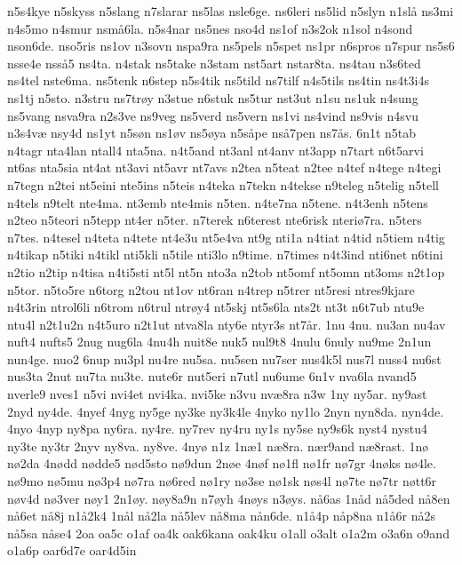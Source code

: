 {n5s4kye
n5skyss
n5slang
n7slarar
ns5las
nsle6ge.
ns6leri
ns5lid
n5slyn
n1sl^^e5
ns3mi
n4s5mo
n4smur
nsm^^e56la.
n5s4nar
ns5nes
nso4d
ns1of
n3s2ok
n1sol
n4sond
nson6de.
nso5ris
ns1ov
n3sovn
nspa9ra
ns5pels
n5spet
ns1pr
n6spros
n7spur
ns5s6
nsse4e
nss^^e55
ns4ta.
n4stak
ns5take
n3stam
nst5art
nstar8ta.
ns4tau
n3s6ted
ns4tel
nste6ma.
ns5tenk
n6step
n5s4tik
ns5tild
ns7tilf
n4s5tils
ns4tin
ns4t3i4s
ns1tj
n5sto.
n3stru
ns7tr^^f8y
n3stue
n6stuk
ns5tur
nst3ut
n1su
ns1uk
n4sung
ns5vang
nsva9ra
n2s3ve
ns9veg
ns5verd
ns5vern
ns1vi
ns4vind
ns9vis
n4svu
n3s4v^^e6
nsy4d
ns1yt
n5s^^f8n
ns1^^f8v
ns5^^f8ya
n5s^^e5pe
ns^^e57pen
ns7^^e5s.
6n1t
n5tab
n4tagr
nta4lan
ntall4
nta5na.
n4t5and
nt3anl
nt4anv
nt3app
n7tart
n6t5arvi
nt6as
nta5sia
nt4at
nt3avi
nt5avr
nt7avs
n2tea
n5teat
n2tee
n4tef
n4tege
n4tegi
n7tegn
n2tei
nt5eini
nte5ins
n5teis
n4teka
n7tekn
n4tekse
n9teleg
n5telig
n5tell
n4tels
n9telt
nte4ma.
nt3emb
nte4mis
n5ten.
n4te7na
n5tene.
n4t3enh
n5tens
n2teo
n5teori
n5tepp
nt4er
n5ter.
n7terek
n6terest
nte6risk
nteri^^f87ra.
n5ters
n7tes.
n4tesel
n4teta
n4tete
nt4e3u
nt5e4va
nt9g
nti1a
n4tiat
n4tid
n5tiem
n4tig
n4tikap
n5tiki
n4tikl
nti5kli
n5tile
nti3lo
n9time.
n7times
n4t3ind
nti6net
n6tini
n2tio
n2tip
n4tisa
n4ti5sti
nt5l
nt5n
nto3a
n2tob
nt5omf
nt5omn
nt3oms
n2t1op
n5tor.
n5to5re
n6torg
n2tou
nt1ov
nt6ran
n4trep
n5trer
nt5resi
ntres9kjare
n4t3rin
ntrol6li
n6trom
n6trul
ntr^^f8y4
nt5skj
nt5s6la
nts2t
nt3t
n6t7ub
ntu9e
ntu4l
n2t1u2n
n4t5uro
n2t1ut
ntva8la
nty6e
ntyr3s
nt7^^e5r.
1nu
4nu.
nu3an
nu4av
nuft4
nufts5
2nug
nug6la
4nu4h
nuit8e
nuk5
nul9t8
4nulu
6nuly
nu9me
2n1un
nun4ge.
nuo2
6nup
nu3pl
nu4re
nu5sa.
nu5sen
nu7ser
nus4k5l
nus7l
nuss4
nu6st
nus3ta
2nut
nu7ta
nu3te.
nute6r
nut5eri
n7utl
nu6ume
6n1v
nva6la
nvand5
nverle9
nves1
n5vi
nvi4et
nvi4ka.
nvi5ke
n3vu
nv^^e68ra
n3w
1ny
ny5ar.
ny9ast
2nyd
ny4de.
4nyef
4nyg
ny5ge
ny3ke
ny3k4le
4nyko
ny1lo
2nyn
nyn8da.
nyn4de.
4nyo
4nyp
ny8pa
ny6ra.
ny4re.
ny7rev
ny4ru
ny1s
ny5se
ny9s6k
nyst4
nystu4
ny3te
ny3tr
2nyv
ny8va.
ny8ve.
4ny^^f8
n1z
1n^^e61
n^^e68ra.
n^^e6r9and
n^^e68rast.
1n^^f8
n^^f82da
4n^^f8dd
n^^f8dde5
n^^f8d5sto
n^^f89dun
2n^^f8e
4n^^f8f
n^^f81fl
n^^f81fr
n^^f87gr
4n^^f8ks
n^^f84le.
n^^f89mo
n^^f85mu
n^^f83p4
n^^f87ra
n^^f86red
n^^f81ry
n^^f83se
n^^f81sk
n^^f8s4l
n^^f87te
n^^f87tr
n^^f8tt6r
n^^f8v4d
n^^f83ver
n^^f8y1
2n1^^f8y.
n^^f8y8a9n
n7^^f8yh
4n^^f8ys
n3^^f8ys.
n^^e56as
1n^^e5d
n^^e55ded
n^^e58en
n^^e56et
n^^e58j
n1^^e52k4
1n^^e5l
n^^e52la
n^^e55lev
n^^e58ma
n^^e5n6de.
n1^^e54p
n^^e5p8na
n1^^e56r
n^^e52s
n^^e55sa
n^^e5se4
2oa
oa5c
o1af
oa4k
oak6kana
oak4ku
o1all
o3alt
o1a2m
o3a6n
o9and
o1a6p
oar6d7e
oar4d5in
}
